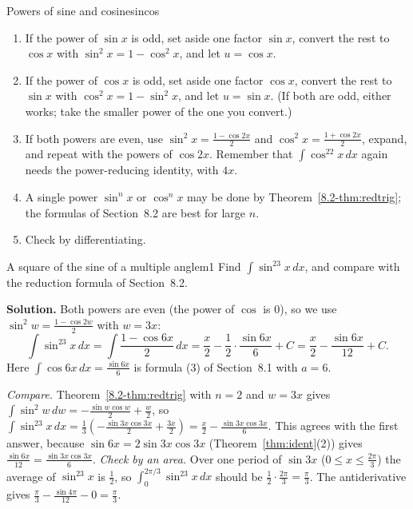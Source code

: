 \documentclass[11pt]{article}
\begin{document}
\begin{proc}{Powers of sine and cosine}{sincos}
\begin{enumerate}[nosep]
  \item If the power of $\sin x$ is odd, set aside one factor $\sin x$, convert the rest to $\cos x$ with $\sin^2x=1-\cos^2x$, and let $u=\cos x$.
  \item If the power of $\cos x$ is odd, set aside one factor $\cos x$, convert the rest to $\sin x$ with $\cos^2x=1-\sin^2x$, and let $u=\sin x$. (If both are odd, either works; take the smaller power of the one you convert.)
  \item If both powers are even, use $\sin^2x=\frac{1-\cos2x}2$ and $\cos^2x=\frac{1+\cos2x}2$, expand, and repeat with the powers of $\cos2x$. Remember that $\int\cos^22x\,dx$ again needs the power-reducing identity, with $4x$.
  \item A single power $\sin^nx$ or $\cos^nx$ may be done by Theorem~\ref{8.2-thm:redtrig}; the formulas of Section~8.2 are best for large $n$.
  \item Check by differentiating.
\end{enumerate}
\end{proc}

\begin{exmp}{A square of the sine of a multiple angle}{m1}
Find $\int\sin^23x\,dx$, and compare with the reduction formula of Section~8.2.

\textbf{Solution.} Both powers are even (the power of $\cos$ is $0$), so we use $\sin^2w=\frac{1-\cos2w}2$ with $w=3x$:
\[\int\sin^23x\,dx=\int\frac{1-\cos6x}2\,dx=\frac x2-\frac12\cdot\frac{\sin6x}6+C=\frac x2-\frac{\sin6x}{12}+C .\]
Here $\int\cos6x\,dx=\frac{\sin6x}6$ is formula (3) of Section~8.1 with $a=6$.

\emph{Compare.} Theorem~\ref{8.2-thm:redtrig} with $n=2$ and $w=3x$ gives $\int\sin^2w\,dw=-\frac{\sin w\cos w}2+\frac w2$, so $\int\sin^23x\,dx=\frac13\left(-\frac{\sin3x\cos3x}2+\frac{3x}2\right)=\frac x2-\frac{\sin3x\cos3x}6$. This agrees with the first answer, because $\sin6x=2\sin3x\cos3x$ (Theorem~\ref{thm:ident}(2)) gives $\frac{\sin6x}{12}=\frac{\sin3x\cos3x}6$.
\emph{Check by an area.} Over one period of $\sin3x$ ($0\le x\le\frac{2\pi}3$) the average of $\sin^23x$ is $\frac12$, so $\int_0^{2\pi/3}\sin^23x\,dx$ should be $\frac12\cdot\frac{2\pi}3=\frac\pi3$. The antiderivative gives $\frac{\pi}3-\frac{\sin4\pi}{12}-0=\frac\pi3$.
\end{exmp}
\end{document}
